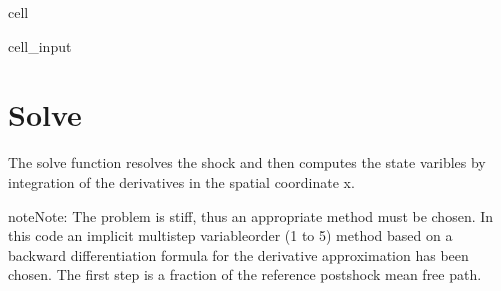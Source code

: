 \documentclass[letterpaper,10pt,english]{jupyterBook}
\begin{document}
\begin{sphinxuseclass}{cell}
\begin{sphinxVerbatimInput}
\begin{sphinxuseclass}{cell_input}
\begin{sphinxVerbatim}[commandchars=\\\{\}]
        
         
    
    
  
  
\end{sphinxVerbatim}

\end{sphinxuseclass}\end{sphinxVerbatimInput}

\end{sphinxuseclass}

\section{Solve}
\label{\detokenize{1_Temperature/Problem_class_definition:solve}}
\sphinxAtStartPar
The solve function resolves the shock and then computes the state varibles by integration of the derivatives in the spatial coordinate x.

\begin{sphinxadmonition}{note}{Note:}
\sphinxAtStartPar
The problem is stiff, thus an appropriate method must be chosen. In this code an implicit multi\sphinxhyphen{}step variable\sphinxhyphen{}order (1 to 5) method based on a backward differentiation formula for the derivative approximation has been chosen. The first step is a fraction of the reference post\sphinxhyphen{}shock mean free path.
\end{sphinxadmonition}
\end{document}
